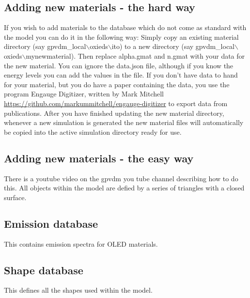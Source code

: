 \subsection{Adding new materials - the hard way}
If you wish to add materials to the database which do not come as standard with the model you can do it in the following way:  Simply copy an existing material directory (say gpvdm\_local$\backslash$oxieds$\backslash$ito) to a new directory (say gpvdm\_local$\backslash$oxieds$\backslash$mynewmaterial).  Then replace alpha.gmat and n.gmat with your data for the new material. You can ignore the data.json file, although if you know the energy levels you can add the values in the file.
\newline
\newline
If you don't have data to hand for your material, but you do have a paper containing the data, you use the program Engauge Digitizer, written by  Mark Mitchell \url{https://github.com/markummitchell/engauge-digitizer} to export data from publications.  After you have finished updating the new material directory, whenever a new simulation is generated the new material files will automatically be copied into the active simulation directory ready for use. 

\subsection{Adding new materials - the easy way}
There is a youtube video on the gpvdm you tube channel describing how to do this. All objects within the model are defied by a series of triangles with a closed surface.

\subsection{Emission database}
This contains emission spectra for OLED materials.

\subsection{Shape database}
\label{sec:shapedatabase}
This defines all the shapes used within the model.

